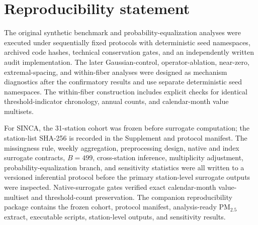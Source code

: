 \section{Reproducibility statement}\label{sec:reproducibility}

The original synthetic benchmark and probability-equalization analyses were executed under sequentially fixed protocols with deterministic seed namespaces, archived code hashes, technical conservation gates, and an independently written audit implementation. The later Gaussian-control, operator-ablation, near-zero, extremal-spacing, and within-fiber analyses were designed as mechanism diagnostics after the confirmatory results and use separate deterministic seed namespaces. The within-fiber construction includes explicit checks for identical threshold-indicator chronology, annual counts, and calendar-month value multisets.

For SINCA, the 31-station cohort was frozen before surrogate computation; the station-list SHA-256 is recorded in the Supplement and protocol manifest. The missingness rule, weekly aggregation, preprocessing design, native and index surrogate contracts, $B=499$, cross-station inference, multiplicity adjustment, probability-equalization branch, and sensitivity statistics were all written to a versioned inferential protocol before the primary station-level surrogate outputs were inspected. Native-surrogate gates verified exact calendar-month value-multiset and threshold-count preservation. The companion reproducibility package contains the frozen cohort, protocol manifest, analysis-ready PM$_{2.5}$ extract, executable scripts, station-level outputs, and sensitivity results.
